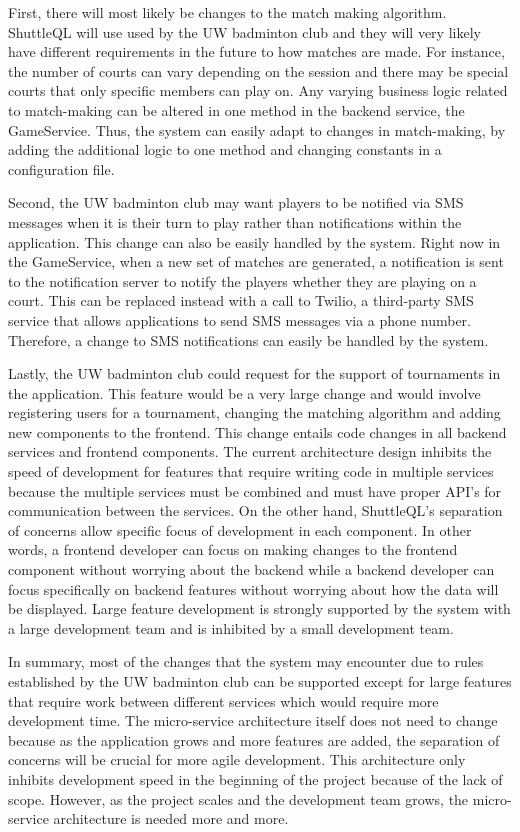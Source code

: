 \documentclass{article}
\begin{document}
First, there will most likely be changes to the match making algorithm. ShuttleQL will use used by the UW badminton club and they will very likely have different requirements in the future to how matches are made. For instance, the number of courts can vary depending on the session and there may be special courts that only specific members can play on. Any varying business logic related to match-making can be altered in one method in the backend service, the GameService. Thus, the system can easily adapt to changes in match-making, by adding the additional logic to one method and changing constants in a configuration file.

Second, the UW badminton club may want players to be notified via SMS messages when it is their turn to play rather than notifications within the application. This change can also be easily handled by the system. Right now in the GameService, when a new set of matches are generated, a notification is sent to the notification server to notify the players whether they are playing on a court. This can be replaced instead with a call to Twilio, a third-party SMS service that allows applications to send SMS messages via a phone number. Therefore, a change to SMS notifications can easily be handled by the system.

Lastly, the UW badminton club could request for the support of tournaments in the application. This feature would be a very large change and would involve registering users for a tournament, changing the matching algorithm and adding new components to the frontend. This change entails code changes in all backend services and frontend components. The current architecture design inhibits the speed of development for features that require writing code in multiple services because the multiple services must be combined and must have proper API’s for communication between the services. On the other hand, ShuttleQL’s separation of concerns allow specific focus of development in each component. In other words, a frontend developer can focus on making changes to the frontend component without worrying about the backend while a backend developer can focus specifically on backend features without worrying about how the data will be displayed. Large feature development is strongly supported by the system with a large development team and is inhibited by a small development team.

In summary, most of the changes that the system may encounter due to rules established by the UW badminton club can be supported except for large features that require work between different services which would require more development time. The micro-service architecture itself does not need to change because as the application grows and more features are added, the separation of concerns will be crucial for more agile development. This architecture only inhibits development speed in the beginning of the project because of the lack of scope. However, as the project scales and the development team grows, the micro-service architecture is needed more and more.
\end{document}
